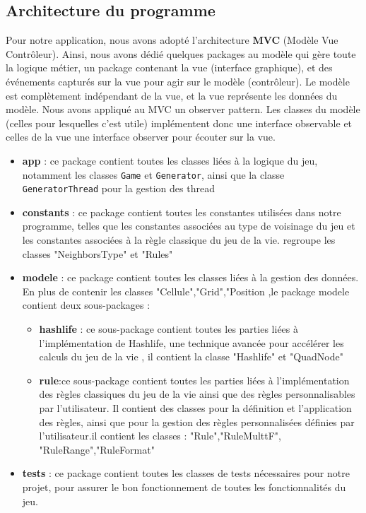 \subsection{Architecture du programme}
Pour notre application, nous avons adopté l’architecture \textbf{MVC} (Modèle Vue Contrôleur).
Ainsi, nous avons dédié quelques packages au modèle qui gère toute la logique métier, un package contenant la vue (interface graphique), et des événements capturés sur la vue pour agir sur le modèle (contrôleur). Le modèle est complètement indépendant de la vue, et la vue représente les données du modèle. Nous avons appliqué au MVC un observer pattern. Les classes du modèle (celles pour lesquelles c'est utile) implémentent donc une interface observable et celles de la vue une interface observer pour écouter sur la vue.
\begin{itemize}
\item \textbf{app} : ce package contient toutes les classes liées à la logique du jeu, notamment les classes \texttt{Game} et \texttt{Generator}, ainsi que la classe \texttt{GeneratorThread} pour la gestion des thread
\item \textbf{constants} : ce package contient toutes les constantes utilisées dans notre programme, telles que les constantes associées au type de voisinage du jeu et les constantes associées à la  règle classique  du jeu de la vie. regroupe les classes "NeighborsType" et "Rules"
\item \textbf{modele} : ce package contient toutes les classes liées  à la gestion des données. En plus de contenir les classes "Cellule","Grid","Position ,le package modele contient deux sous-packages :
\begin{itemize}
\item \textbf{hashlife} : ce sous-package contient toutes les parties liées à l'implémentation de Hashlife, une technique avancée pour accélérer les calculs du jeu de la vie , il contient la classe "Hashlife" et "QuadNode"
\item \textbf{rule}:ce sous-package contient toutes les parties liées à l'implémentation des règles classiques du jeu de la vie ainsi que des règles personnalisables par l'utilisateur. Il contient des classes pour la définition et l'application des règles, ainsi que pour la gestion des règles personnalisées définies par l'utilisateur.il contient les classes : "Rule","RuleMulttF",
"RuleRange","RuleFormat"
\end{itemize}
\item \textbf{tests} : ce package contient toutes les classes de tests nécessaires pour notre projet, pour assurer le bon fonctionnement de toutes les fonctionnalités du jeu.

\end{itemize}
